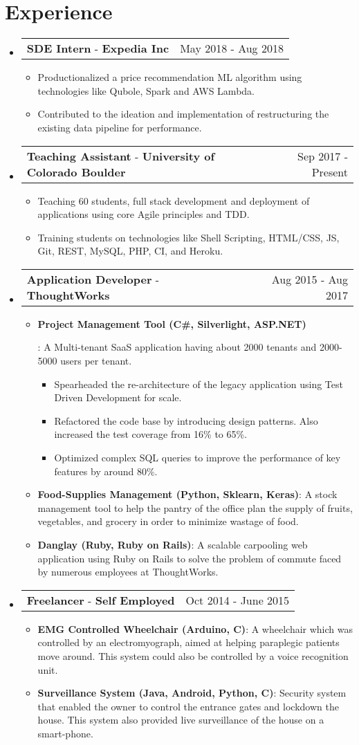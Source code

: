 \documentclass[letterpaper,11pt]{article}
\makeatletter
\newcommand{\resumeItem}[2]{
  \linespread{1.2}
  \item\small{
      \textbf{#1}{: #2}
    }
}
\newcommand{\resumePoint}[1]{
  \linespread{1.2}
  \item\small{#1}
}
\newcommand{\resumeExperienceSubheading}[5]{
    \item
    \begin{tabular*}{0.97\textwidth}{l@{\extracolsep{\fill}}r}
      \textbf{#1} \normalfont{\small#2} - \textbf{#3}\normalfont{#4} & #5 \\
    \end{tabular*}\vspace{-4pt}
}
\newcommand{\resumeSubHeadingListStart}{\begin{itemize}[leftmargin=*]}
\newcommand{\resumeSubHeadingListEnd}{\end{itemize}\vspace{-5pt}}
\newcommand{\resumeItemListStart}{\begin{itemize}}
\newcommand{\resumeItemListEnd}{\end{itemize}\vspace{-2pt}}
\newcommand{\resumeInnerItemListStart}{\begin{itemize}\vspace{-1pt}}
\newcommand{\resumeInnerItemListEnd}{\end{itemize}\vspace{2pt}}
\makeatother
\begin{document}
\section{Experience}
  \resumeSubHeadingListStart
  \resumeExperienceSubheading
      {SDE Intern}{(Data Engineering)}{Expedia Inc}{, Chicago, USA}{May 2018 - Aug 2018}
      \resumeItemListStart
          \resumePoint{Productionalized a price recommendation ML algorithm using technologies like Qubole, Spark and AWS Lambda.}
          \resumePoint{Contributed to the ideation and implementation of restructuring the existing data pipeline for performance.}
      \resumeItemListEnd
    \resumeExperienceSubheading
      {Teaching Assistant}{\href{https://www.colorado.edu/cs/csci-3308-software-development-methods-and-tools}{(S/W Dev Methods \& Tools)}}{University of Colorado Boulder}{}{Sep 2017 - Present}
      \resumeItemListStart
          \resumePoint{Teaching 60 students, full stack development and deployment of applications using core Agile principles and TDD.}
          \resumePoint{Training students on technologies like Shell Scripting, HTML/CSS, JS, Git, REST, MySQL, PHP, CI, and Heroku.}
      \resumeItemListEnd
    \resumeExperienceSubheading
      {Application Developer}{}{ThoughtWorks}{, Bangalore, India}{Aug 2015 - Aug 2017}
      \resumeItemListStart
      \resumeItem {Project Management Tool (C\#, Silverlight, ASP.NET)}
          {A Multi-tenant SaaS application having about 2000 tenants and 2000-5000 users per tenant.
          \resumeInnerItemListStart
            \resumePoint {Spearheaded the re-architecture of the legacy application using Test Driven Development for scale.}
            \resumePoint {Refactored the code base by introducing design patterns. Also increased the test coverage from 16\% to 65\%.}
            \resumePoint {Optimized complex SQL queries to improve the performance of key features by around 80\%.}
          \resumeInnerItemListEnd}
        \resumeItem {Food-Supplies Management (Python, Sklearn, Keras)}{A stock management tool to help the pantry of the office plan the supply of fruits, vegetables, and grocery in order to minimize wastage of food.}
      \resumeItem {Danglay (Ruby, Ruby on Rails)}{A scalable carpooling web application using Ruby on Rails to solve the problem of commute faced by numerous employees at ThoughtWorks.}
      \resumeItemListEnd
    \resumeExperienceSubheading
      {Freelancer}{(Embedded System Prototyping)}{Self Employed}{, Bangalore, India}{Oct 2014 - June 2015}
      \resumeItemListStart
          \resumeItem{EMG Controlled Wheelchair (Arduino, C)}{A wheelchair which was controlled by an electromyograph, aimed at helping paraplegic patients move around. This system could also be controlled by a voice recognition unit.}
          \resumeItem{Surveillance System (Java, Android, Python, C)}{Security system that enabled the owner to control the entrance gates and lockdown the house. This system also provided live surveillance of the house on a smart-phone.}
      \resumeItemListEnd
  \resumeSubHeadingListEnd
\end{document}
